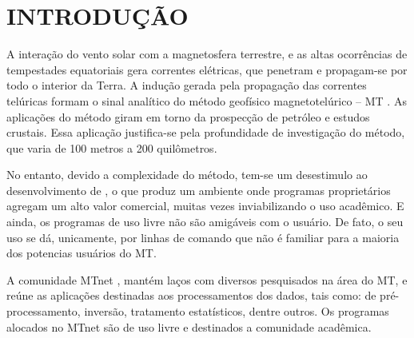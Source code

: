 \setcounter{page}{8}
\chapter{INTRODUÇÃO}
   


    
    
    A interação do vento solar com a magnetosfera terrestre, e as altas ocorrências de tempestades equatoriais gera correntes elétricas, que penetram e propagam-se por todo o interior da Terra. A indução gerada pela propagação das correntes telúricas formam o sinal analítico do método geofísico magnetotelúrico -- MT \cite{parkinson93}. As aplicações do método giram em torno da prospecção de petróleo e estudos crustais. Essa aplicação justifica-se pela profundidade de investigação do método, que varia de 100 metros a 200 quilômetros.

    No entanto, devido a complexidade do método, tem-se um desestimulo ao desenvolvimento de \softwares, o que produz um ambiente onde programas proprietários agregam um alto valor comercial, muitas vezes inviabilizando o uso acadêmico. E ainda, os programas de uso livre não são amigáveis com o usuário. De fato, o seu uso se dá, unicamente, por linhas de comando que não é familiar para a maioria dos potencias usuários do MT.

    A comunidade MTnet \cite{mtnet}, mantém laços com diversos pesquisados na área do MT, e reúne as aplicações destinadas aos processamentos dos dados, tais como:  de pré-processamento, inversão, tratamento estatísticos, dentre outros. Os programas alocados no MTnet são de uso livre e destinados a comunidade acadêmica. %
    
